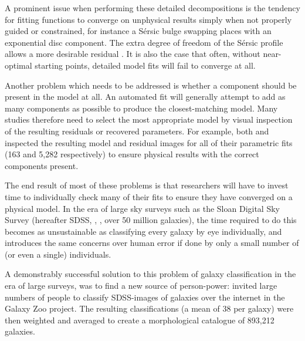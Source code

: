\documentclass[../main.tex]{subfiles}
\begin{document}
A prominent issue when performing these detailed decompositions is the tendency for fitting functions to converge on unphysical results simply when not properly guided or constrained, for instance a S\'ersic bulge swapping places with an exponential disc component. The extra degree of freedom of the S\'ersic profile allows a more desirable residual \citep{2017MNRAS.469.3363K}. It is also the case that often, without near-optimal starting points, detailed model fits will fail to converge at all.

Another problem which needs to be addressed is whether a component should be present in the model at all. An automated fit will generally attempt to add as many components as possible to produce the closest-matching model. Many studies therefore need to select the most appropriate model by visual inspection of the resulting residuals or recovered parameters. For example, both \citet{Vika2014:1408.4070v1} and \citet{2018MNRAS.473.4731K} inspected the resulting model and residual images for all of their parametric fits (163 and 5,282 respectively) to ensure physical results with the correct components present.

The end result of most of these problems is that researchers will have to invest time to individually check many of their fits to ensure they have converged on a physical model. In the era of large sky surveys such as the Sloan Digital Sky Survey (hereafter SDSS, \citealt{2017AJ....154...28B}, \citealt{SDSSDR7}, over 50 million galaxies), the time required to do this becomes as unsustainable as classifying every galaxy by eye individually, and introduces the same concerns over human error if done by only a small number of (or even a single) individuals. 


A demonstrably successful solution to this problem of galaxy classification in the era of large surveys, was to find a new source of person-power: \cite{Lintott2008:0804.4483v1} invited large numbers of people to classify SDSS-images of galaxies over the internet in the Galaxy Zoo project. The resulting classifications (a mean of 38 per galaxy) were then weighted and averaged to create a morphological catalogue of 893,212 galaxies.
\end{document}
